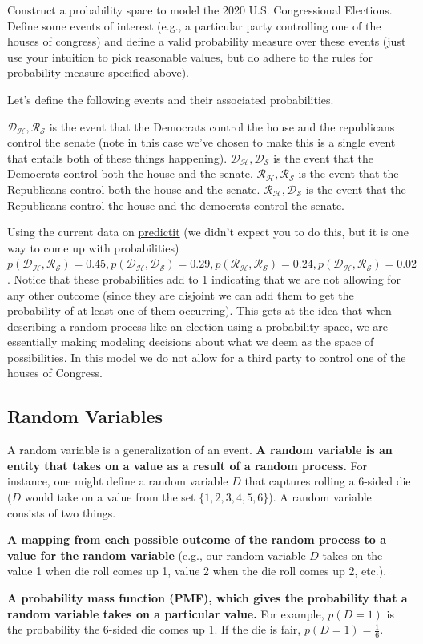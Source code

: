 \documentclass{tufte-handout}
\begin{document}
\begin{exercise}
Construct a probability space to model the 2020 U.S. Congressional Elections.  Define some events of interest (e.g., a particular party controlling one of the houses of congress) and define a valid probability measure over these events (just use your intuition to pick reasonable values, but do adhere to the rules for probability measure specified above).
\begin{boxedsolution}
Let's define the following events and their associated probabilities.
\bi
\item $\mathcal{D_H, R_S}$ is the event that the Democrats control the house and the republicans control the senate (note in this case we've chosen to make this is a single event that entails both of these things happening).  $\mathcal{D_H,D_S}$ is the event that the Democrats control both the house and the senate.  $\mathcal{R_H,R_S}$ is the event that the Republicans control both the house and the senate.  $\mathcal{R_H,D_S}$ is the event that the Republicans control the house and the democrats control the senate.
\item Using the current data on \href{https://www.predictit.org/markets/2/Congress}{predictit} (we didn't expect you to do this, but it is one way to come up with probabilities) $p(\mathcal{D_H, R_S}) = 0.45, p(\mathcal{D_H, D_S}) = 0.29, p(\mathcal{R_H, R_S}) = 0.24, p(\mathcal{D_H, R_S}) = 0.02$.  Notice that these probabilities add to 1 indicating that we are not allowing for any other outcome (since they are disjoint we can add them to get the probability of at least one of them occurring). This gets at the idea that when describing a random process like an election using a probability space, we are essentially making modeling decisions about what we deem as the space of possibilities.  In this model we do not allow for a third party to control one of the houses of Congress.
\ei
\end{boxedsolution}
\end{exercise}

\subsection{Random Variables}
A random variable is a generalization of an event.  \textbf{A random variable is an entity that takes on a value as a result of a random process.}  For instance, one might define a random variable $D$ that captures rolling a 6-sided die ($D$ would take on a value from the set $\{1, 2, 3, 4, 5, 6\}$).  A random variable consists of two things.
\bi
\item \textbf{A mapping from each possible outcome of the random process to a value for the random variable} (e.g., our random variable $D$ takes on the value 1 when die roll comes up 1, value 2 when the die roll comes up 2, etc.).
\item \textbf{A probability mass function (PMF), which gives the probability that a random variable takes on a particular value.}  For example, $p(D = 1)$ is the probability the 6-sided die comes up 1.  If the die is fair, $p(D=1)=\frac{1}{6}$.
\end{document}
